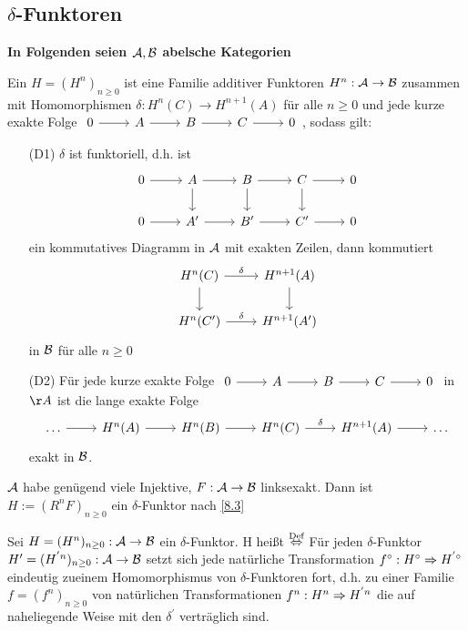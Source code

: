 \subsection{$\delta$-Funktoren}
\begin{center}
	\textbf{In Folgenden seien $\mathcal{A}, \mathcal{B}$ abelsche Kategorien}
\end{center}
\begin{df}
	Ein  $H=(H^n)_{n\geq 0}$ ist eine Familie additiver Funktoren $H^n:\mathcal{A} \to \mathcal{B}$ zusammen mit Homomorphismen $\delta:H^n(C) \to H^{n+1}(A)$ für alle $n\geq 0$ und jede kurze exakte Folge $\begin{tikzcd}
	0\arrow{r} & A \arrow{r} & B\arrow{r} & C \arrow{r} & 0
	\end{tikzcd}$, sodass gilt:
	\begin{enumerate}
		\item[(D1)] $\delta$ ist funktoriell, d.h. ist 
		$$\begin{tikzcd}
		0\arrow{r} & A\arrow{d} \arrow{r} & B\arrow{r} \arrow{d}& C\arrow{d} \arrow{r} & 0\\
		0\arrow{r} & A' \arrow{r} & B'\arrow{r} & C' \arrow{r} & 0
		\end{tikzcd} $$
		ein kommutatives Diagramm in $\mathcal{A}$ mit exakten Zeilen, dann kommutiert 
		$$\begin{tikzcd}
		H^n(C) \arrow{d}\arrow{r}{\delta} & H^{n+1}(A) \arrow{d} \\
		H^n(C') \arrow{r}{\delta} & H^{n+1}(A')
		\end{tikzcd}$$
		in $\mathcal{B}$ für alle $n\geq 0$
		\item[(D2)] Für jede kurze exakte Folge $\begin{tikzcd}
		0\arrow{r} & A \arrow{r} & B\arrow{r} & C \arrow{r} & 0
		\end{tikzcd}$ in $\AA$ ist die lange exakte Folge 
		$$\begin{tikzcd}
		\ldots \arrow{r} & H^n(A) \arrow{r} & H^n(B) \arrow{r}& H^n(C) \arrow{r}{\delta} & H^{n+1}(A) \arrow{r} & \ldots
		\end{tikzcd}$$
		exakt in $\mathcal{B}$.
	\end{enumerate}
\end{df}
\begin{bsp}
	$\mathcal{A}$ habe genügend viele Injektive, $F:\mathcal{A} \to \mathcal{B}$ linksexakt. Dann ist $H:=(R^nF)_{n\geq 0}$ ein $\delta$-Funktor nach \ref{8.3}
\end{bsp}
\begin{df}
	Sei $H=(H^n)_{n\geq 0}: \mathcal{A} \to \mathcal{B} $ ein $\delta$-Funktor. H heißt  $\overset{\text{Def}}{\Leftrightarrow} $ Für jeden $\delta$-Funktor $H'=(H^{'n})_{n\geq 0}: \mathcal{A} \to \mathcal{B} $ setzt sich jede natürliche Transformation $ f^{\circ}: H^{\circ} \Rightarrow H^{'\circ} $ eindeutig zueinem Homomorphismus von $\delta$-Funktoren fort, d.h. zu einer Familie $f=(f^{n})_{n \geq 0}$ von natürlichen Transformationen $f^{n}: H^{n} \Rightarrow H^{'n} $ die auf naheliegende Weise mit den $\delta^{'}$ verträglich sind.
\end{df}
